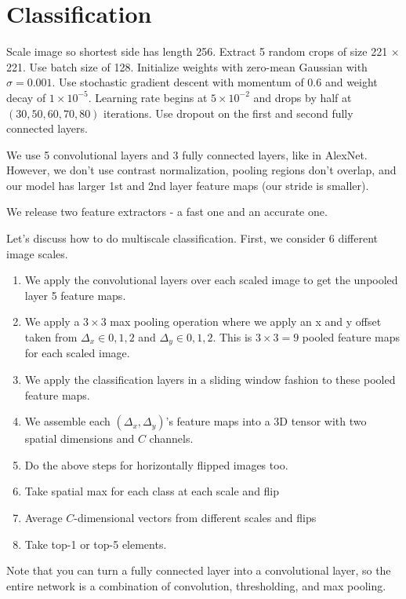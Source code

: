 \documentclass[a4paper]{article}
\begin{document}
\section{Classification}
Scale image so shortest side has length 256. Extract 5 random crops of size
221 $\times$ 221. Use batch size of 128. Initialize weights with zero-mean
Gaussian with $\sigma = 0.001$. Use stochastic gradient descent with momentum
of 0.6 and weight decay of $1 \times 10^{-5}$. Learning rate begins at
$5 \times 10^{-2}$ and drops by half at $(30, 50, 60, 70, 80)$ iterations. Use
dropout on the first and second fully connected layers.

We use 5 convolutional layers and 3 fully connected layers, like in AlexNet.
However, we don't use contrast normalization, pooling regions don't overlap, and
our model has larger 1st and 2nd layer feature maps (our stride is smaller).

We release two feature extractors - a fast one and an accurate one.

Let's discuss how to do multiscale classification. First, we consider 6
different image scales.

\begin{enumerate}
  \item We apply the convolutional layers over each scaled
  image to get the unpooled layer 5 feature maps.
  \item We apply a $3 \times 3$ max pooling operation where we apply an
  x and y offset taken from $\Delta_x \in {0, 1, 2}$ and $\Delta_y \in
  {0, 1, 2}$. This is $3 \times 3 = 9$ pooled feature maps for each scaled
  image.
  \item We apply the classification layers in a sliding window fashion to these
  pooled feature maps.
  \item We assemble each $(\Delta_x, \Delta_y)$'s feature maps into a 3D tensor
  with two spatial dimensions and $C$ channels.
  \item Do the above steps for horizontally flipped images too.
  \item Take spatial max for each class at each scale and flip
  \item Average $C$-dimensional vectors from different scales and flips
  \item Take top-1 or top-5 elements.
\end{enumerate}

Note that you can turn a fully connected layer into a convolutional layer, so
the entire network is a combination of convolution, thresholding, and max
pooling.
\end{document}

